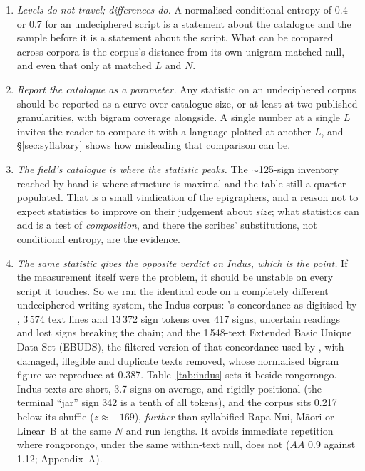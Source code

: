 \documentclass[11pt,a4paper]{article}
\begin{document}
\begin{enumerate}
\item \emph{Levels do not travel; differences do.} A normalised conditional entropy of 0.4 or 0.7 for an undeciphered script is a statement about the catalogue and the sample before it is a statement about the script. What can be compared across corpora is the corpus's distance from its own unigram-matched null, and even that only at matched $L$ and $N$.
\item \emph{Report the catalogue as a parameter.} Any statistic on an undeciphered corpus should be reported as a curve over catalogue size, or at least at two published granularities, with bigram coverage alongside. A single number at a single $L$ invites the reader to compare it with a language plotted at another $L$, and \S\ref{sec:syllabary} shows how misleading that comparison can be.
\item \emph{The field's catalogue is where the statistic peaks.} The $\sim$125-sign inventory reached by hand is where structure is maximal and the table still a quarter populated. That is a small vindication of the epigraphers, and a reason not to expect statistics to improve on their judgement about \emph{size}; what statistics can add is a test of \emph{composition}, and there the scribes' substitutions, not conditional entropy, are the evidence.
\item \emph{The same statistic gives the opposite verdict on Indus, which is the point.} If the measurement itself were the problem, it should be unstable on every script it touches. So we ran the identical code on a completely different undeciphered writing system, the Indus corpus: \citet{mahadevan1977}'s concordance as digitised by \citet{hamilchin}, 3\,574 text lines and 13\,372 sign tokens over 417 signs, uncertain readings and lost signs breaking the chain; and the 1\,548-text Extended Basic Unique Data Set (EBUDS), the filtered version of that concordance used by \citet{rao2009}, with damaged, illegible and duplicate texts removed, whose normalised bigram figure we reproduce at 0.387. Table~\ref{tab:indus} sets it beside rongorongo. Indus texts are short, 3.7 signs on average, and rigidly positional (the terminal ``jar'' sign 342 is a tenth of all tokens), and the corpus sits 0.217 below its shuffle ($z\approx-169$), \emph{further} than syllabified Rapa Nui, M\=aori or Linear~B at the same $N$ and run lengths. It avoids immediate repetition where rongorongo, under the same within-text null, does not ($AA$ 0.9 against 1.12; Appendix~A).


\end{enumerate}
\end{document}
